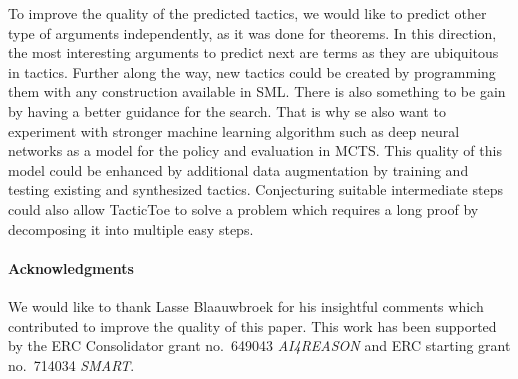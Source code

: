 \documentclass[runningheads,a4paper,draft]{svjour3}
\def\sml{\textsf{SML}\xspace}
\def\tactictoe{\textsf{TacticToe}\xspace}
\begin{document}
To improve the quality of the predicted tactics,
we would like to predict other type of arguments independently, as it was done
for theorems. In this direction, the most interesting arguments to
predict next are terms as they are ubiquitous in tactics. Further along the way,
new tactics could be created by programming them with any construction 
available in \sml. There is also something to be gain by 
having a better guidance for the search.
That is why se also want to experiment with stronger machine learning algorithm
such as deep neural networks as a model for the policy and evaluation in MCTS.
This quality of this model could be enhanced by additional data augmentation by
training and testing existing and synthesized tactics.
Conjecturing suitable intermediate steps could also allow \tactictoe to solve 
a problem which requires a long proof by decomposing it into multiple easy 
steps.

\paragraph{Acknowledgments}\label{sect:acks}
We would like to thank Lasse Blaauwbroek for his insightful comments which
contributed to improve the quality of this paper. This work has been supported
by the ERC Consolidator grant no.\ 649043 \textit{AI4REASON} and ERC starting
grant no.\ 714034 \textit{SMART}.



\end{document}

